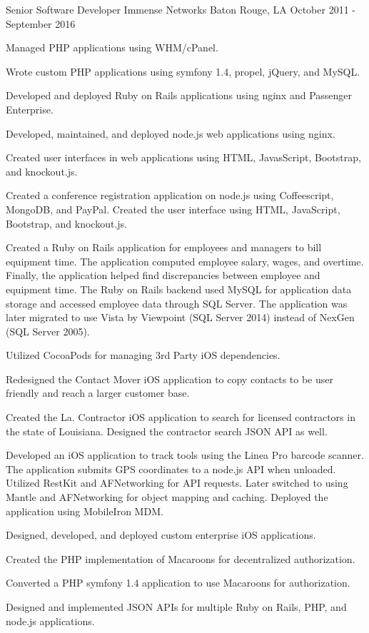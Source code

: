 \documentclass[letterpaper]{awesome-cv}
\begin{document}
\begin{cventries}
  \cventry
    {Senior Software Developer}
    {Immense Networks}
    {Baton Rouge, LA}
    {October 2011 - September 2016}
    {\begin{cvitems}
      \item {Managed PHP applications using WHM/cPanel.}
      \item {Wrote custom PHP applications using symfony 1.4, propel, jQuery, and MySQL.}
      \item {Developed and deployed Ruby on Rails applications using nginx and Passenger Enterprise.}
      \item {Developed, maintained, and deployed node.js web applications using nginx.}
      \item {Created user interfaces in web applications using HTML, JavasScript, Bootstrap, and knockout.js.}
      \item {Created a conference registration application on node.js using Coffeescript, MongoDB, and PayPal. Created the user interface using HTML, JavaScript, Bootstrap, and knockout.js.}
      \item {Created a Ruby on Rails application for employees and managers to bill equipment time. The application computed employee salary, wages, and overtime. Finally, the application helped find discrepancies between employee and equipment time. The Ruby on Rails backend used MySQL for application data storage and accessed employee data through SQL Server. The application was later migrated to use Vista by Viewpoint (SQL Server 2014) instead of NexGen (SQL Server 2005).}
      \item {Utilized CocoaPods for managing 3rd Party iOS dependencies.}
      \item {Redesigned the Contact Mover iOS application to copy contacts to be user friendly and reach a larger customer base.}
      \item {Created the La. Contractor iOS application to search for licensed contractors in the state of Louisiana. Designed the contractor search JSON API as well.}
      \item {Developed an iOS application to track tools using the Linea Pro barcode scanner. The application submits GPS coordinates to a node.js API when unloaded. Utilized RestKit and AFNetworking for API requests. Later switched to using Mantle and AFNetworking for object mapping and caching. Deployed the application using MobileIron MDM.}
      \item {Designed, developed, and deployed custom enterprise iOS applications.}
      \item {Created the PHP implementation of Macaroons for decentralized authorization.}
      \item {Converted a PHP symfony 1.4 application to use Macaroons for authorization.}
      \item {Designed and implemented JSON APIs for multiple Ruby on Rails, PHP, and node.js applications.}
      \end{cvitems}}


\end{cventries}
\end{document}
